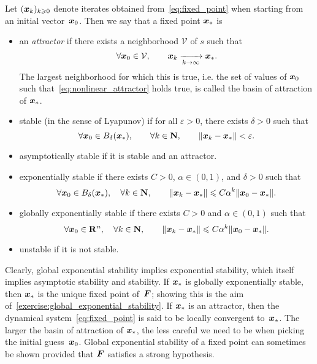 \begin{definition}
    Let $(\mathbf{\boldsymbol{x}}_k)_{k\geqslant0}$ denote iterates obtained from~\eqref{eq:fixed_point} when starting from an initial vector~$\mathbf{\boldsymbol{x}}_0$.
    Then we say that a fixed point $\mathbf{\boldsymbol{x}}_*$ is
    \begin{itemize}
        \item
            an \emph{attractor} if there exists a neighborhood $\mathcal V$ of $s$ such that
            \begin{equation}
                \label{eq:nonlinear_attractor}
                \forall \mathbf{\boldsymbol{x}}_0 \in \mathcal V, \qquad
                \mathbf{\boldsymbol{x}}_k \xrightarrow[k \to \infty]{} \mathbf{\boldsymbol{x}}_*.
            \end{equation}
            The largest neighborhood for which this is true,
            i.e. the set of values of $\mathbf{\boldsymbol{x}}_0$ such that~\eqref{eq:nonlinear_attractor} holds true,
            is called the basin of attraction of $\mathbf{\boldsymbol{x}}_*$.

        \item
            stable (in the sense of Lyapunov) if for all $\varepsilon > 0$,
            there exists $\delta > 0$ such that
            \[
                \forall \mathbf{\boldsymbol{x}}_0 \in B_{\delta}(\mathbf{\boldsymbol{x}}_*), \qquad
                \forall k \in \mathbf N, \qquad
                \lVert\mathbf{\boldsymbol{x}}_k - \mathbf{\boldsymbol{x}}_*\rVert < \varepsilon.
            \]

        \item
            asymptotically stable if it is stable and an attractor.

        \item
            exponentially stable if there exists $C > 0$, $\alpha \in (0, 1)$, and $\delta > 0$ such that
            \[
                \forall \mathbf{\boldsymbol{x}}_0 \in B_{\delta}(\mathbf{\boldsymbol{x}}_*),
                \quad \forall k \in \mathbf N, \qquad
                \lVert\mathbf{\boldsymbol{x}}_k - \mathbf{\boldsymbol{x}}_*\rVert \leqslant C \alpha^k \lVert\mathbf{\boldsymbol{x}}_0 - \mathbf{\boldsymbol{x}}_*\rVert.
            \]

        \item
            globally exponentially stable if there exists $C > 0$ and $\alpha \in (0, 1)$ such that
            \[
                \forall \mathbf{\boldsymbol{x}}_0 \in \mathbf R^n,
                \quad \forall k \in \mathbf N, \qquad
                \lVert\mathbf{\boldsymbol{x}}_k - \mathbf{\boldsymbol{x}}_*\rVert \leqslant C \alpha^k \lVert\mathbf{\boldsymbol{x}}_0 - \mathbf{\boldsymbol{x}}_*\rVert.
            \]
        \item
            unstable if it is not stable.
    \end{itemize}
\end{definition}
Clearly, global exponential stability implies exponential stability,
which itself implies asymptotic stability and stability.
If $\mathbf{\boldsymbol{x}}_*$ is globally exponentially stable,
then $\mathbf{\boldsymbol{x}}_*$ is the unique fixed point of~$\mathbf{\boldsymbol{F}}$;
showing this is the aim of~\cref{exercise:global_exponential_stability}.
If $\mathbf{\boldsymbol{x}}_*$ is an attractor,
then the dynamical system~\eqref{eq:fixed_point} is said to be locally convergent to~$\mathbf{\boldsymbol{x}}_*$.
The larger the basin of attraction of $\mathbf{\boldsymbol{x}}_*$,
the less careful we need to be when picking the initial guess~$\mathbf{\boldsymbol{x}}_0$.
Global exponential stability of a fixed point can sometimes be shown
provided that $\mathbf{\boldsymbol{F}}$ satisfies a strong hypothesis.

